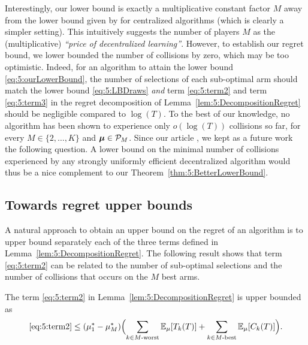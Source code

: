 Interestingly, our lower bound is exactly a multiplicative constant factor $M$ away from the lower bound given by \cite{Anantharam87a} for centralized algorithms (which is clearly a simpler setting). This intuitively suggests the number of players $M$ as the (multiplicative) \emph{``price of decentralized learning''}. However, to establish our regret bound, we lower bounded the number of collisions by zero, which may be too optimistic.
%
Indeed, for an algorithm to attain the lower bound \eqref{eq:5:ourLowerBound}, the number of selections of each sub-optimal arm should match the lower bound \eqref{eq:5:LBDraws} \emph{and} term \ref{eq:5:term2} and term \ref{eq:5:term3} in the regret decomposition of Lemma~\ref{lem:5:DecompositionRegret} should be negligible compared to  $\log(T)$.
To the best of our knowledge, no algorithm has been shown to experience only $o(\log(T))$ collisions so far,
for every $M \in \{2,\dots,K\}$ and $\boldsymbol{\mu} \in \mathcal{P}_M$.
%
Since our article \cite{Besson2018ALT}, we kept as a future work the following question.
A lower bound on the minimal number of collisions experienced by any strongly uniformly efficient decentralized algorithm would thus be a nice complement to our Theorem~\ref{thm:5:BetterLowerBound}.


\subsection{Towards regret upper bounds}

A natural approach to obtain an upper bound on the regret of an algorithm is to upper bound separately each of the three terms defined in Lemma~\ref{lem:5:DecompositionRegret}.
The following result shows that term \ref{eq:5:term2} can be related to the number of sub-optimal selections and the number of collisions that occurs on the $M$ best arms.

\begin{lemma}\label{lem:5:1stUpperBound}
  The term \ref{eq:5:term2} in Lemma~\ref{lem:5:DecompositionRegret} is upper bounded as
  \begin{equation}\label{eq:5:1stUpperBound}
    \ref{eq:5:term2} \leq (\mu_1^* - \mu_M^*) \Bigl(    \sum_{k \in M\text{-}\mathrm{worst}} \mathbb{E}_{\mu}[T_k(T)]
    + \sum_{k \in M\text{-}\mathrm{best}} \mathbb{E}_{\mu}[C_{k}(T)]
    \Bigr).
  \end{equation}
\end{lemma}

